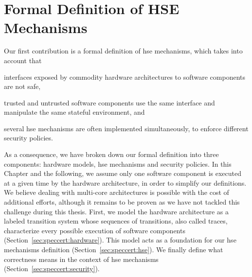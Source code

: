 \chapter{Formal Definition of HSE Mechanisms}
\label{chapter:speccert}


\vspace{1cm}\noindent
%
Our first contribution is a formal definition of \ac{hse} mechanisms, which
takes into account that
%
\begin{inparaenum}[(1)]
\item interfaces exposed by commodity hardware architectures to software
  components are not safe,
\item trusted and untrusted software components use the same interface and
  manipulate the same stateful environment, and
\item several \ac{hse} mechanisms are often implemented simultaneously, to
  enforce different security policies.
\end{inparaenum}
%
%
As a consequence,
%
%
we have broken down our formal definition into three components: hardware
models, \ac{hse} mechanisms and security policies.
%
%
In this Chapter and the following, we assume only one software component is
executed at a given time by the hardware architecture, in order to simplify our
definitions.
%
We believe dealing with multi-core architectures is possible with the cost of
additional efforts, although it remains to be proven as we have not tackled this
challenge during this thesis.
%
%
First, we model the hardware architecture as a labeled transition system whose
sequences of transitions, also called traces, characterize every possible
execution of software components (Section~\ref{sec:speccert:hardware}).
%
This model acts as a foundation for our \ac{hse} mechanisms definition
(Section~\ref{sec:speccert:hse}).
%
We finally define what correctness means in the context of \ac{hse} mechanisms
(Section~\ref{sec:speccert:security}).


